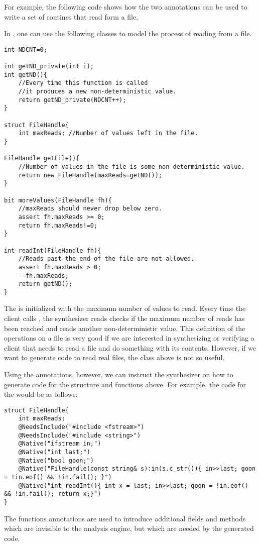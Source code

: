 For example, the following code shows how the two  annotations can be used to write a set of routines that read form a file.

\begin{Example}
In \Sk{}, one can use the following classes to model the process of reading from a file.

\begin{lstlisting}
int NDCNT=0;

int getND_private(int i);
int getND(){
    //Every time this function is called
    //it produces a new non-deterministic value.
    return getND_private(NDCNT++);
}

struct FileHandle{
    int maxReads; //Number of values left in the file.
}

FileHandle getFile(){
    //Number of values in the file is some non-deterministic value.
    return new FileHandle(maxReads=getND());
}

bit moreValues(FileHandle fh){
    //maxReads should never drop below zero.
    assert fh.maxReads >= 0; 
    return fh.maxReads!=0;
}

int readInt(FileHandle fh){
    //Reads past the end of the file are not allowed.
    assert fh.maxReads > 0;
    --fh.maxReads; 
    return getND();
}
\end{lstlisting}

The  is initialized with the maximum number of values to read. Every time the client calls , the synthesizer reads checks if the maximum number of reads has been reached and reads another non-deterministic value. This definition of the operations on a file is very good if we are interested in synthesizing or verifying a client that needs to read a file and do something with its contents. However, if we want to generate code to read real files, the class above is not so useful. 

Using the  annotations, however, we can instruct the synthesizer on how to generate code for the structure and functions above. For example, the code for the  would be as follows:

\begin{lstlisting}
struct FileHandle{
    int maxReads;
    @NeedsInclude("#include <fstream>")
    @NeedsInclude("#include <string>")
    @Native("ifstream in;")
    @Native("int last;")
    @Native("bool goon;")
    @Native("FileHandle(const string& s):in(s.c_str()){ in>>last; goon = !in.eof() && !in.fail(); }")
    @Native("int readInt(){ int x = last; in>>last; goon = !in.eof() && !in.fail(); return x;}")
}
\end{lstlisting}
The functions annotations are used to introduce additional fields and methods which are invisible to the analysis engine, but which are needed by the generated code. 


\end{Example}
